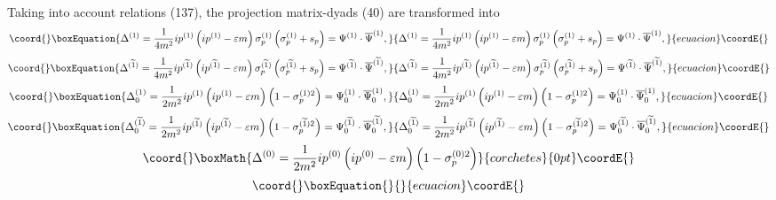 \documentclass[a4paper,12pt]{article}
\begin{document}
Taking into account relations (137), the projection matrix-dyads
(40) are transformed into
\begin{equation}\coord{}\boxEquation{
\Delta ^{(1)}=\frac 1{4m^2}ip^{(1)}\left( ip^{(1)}-\varepsilon
m\right) \sigma _p^{(1)}\left( \sigma _p^{(1)}+s_p\right) =\Psi
^{(1)}\cdot \overline{ \Psi }^{(1)}  ,\label{139}
}{
\Delta ^{(1)}=\frac 1{4m^2}ip^{(1)}\left( ip^{(1)}-\varepsilon
m\right) \sigma _p^{(1)}\left( \sigma _p^{(1)}+s_p\right) =\Psi
^{(1)}\cdot \overline{ \Psi }^{(1)}  ,}{ecuacion}\coordE{}\end{equation}
\begin{equation}\coord{}\boxEquation{
\Delta ^{(\widetilde{1})}=\frac 1{4m^2}ip^{(\widetilde{1})}\left(
ip^{( \widetilde{1})}-\varepsilon m\right) \sigma
_p^{(\widetilde{1})}\left( \sigma _p^{(\widetilde{1})}+s_p\right)
=\Psi ^{(\widetilde{1})}\cdot \overline{\Psi }^{(\widetilde{1})} ,
\label{140}
}{
\Delta ^{(\widetilde{1})}=\frac 1{4m^2}ip^{(\widetilde{1})}\left(
ip^{( \widetilde{1})}-\varepsilon m\right) \sigma
_p^{(\widetilde{1})}\left( \sigma _p^{(\widetilde{1})}+s_p\right)
=\Psi ^{(\widetilde{1})}\cdot \overline{\Psi }^{(\widetilde{1})} ,
}{ecuacion}\coordE{}\end{equation}
\begin{equation}\coord{}\boxEquation{
\Delta _0^{(1)}=\frac 1{2m^2}ip^{(1)}\left( ip^{(1)}-\varepsilon
m\right) \left( 1-\sigma _p^{(1)2}\right) =\Psi _0^{(1)}\cdot
\overline{\Psi }_0^{(1)} ,\label{141}
}{
\Delta _0^{(1)}=\frac 1{2m^2}ip^{(1)}\left( ip^{(1)}-\varepsilon
m\right) \left( 1-\sigma _p^{(1)2}\right) =\Psi _0^{(1)}\cdot
\overline{\Psi }_0^{(1)} ,}{ecuacion}\coordE{}\end{equation}
\begin{equation}\coord{}\boxEquation{
\Delta _0^{(\widetilde{1})}=\frac
1{2m^2}ip^{(\widetilde{1})}\left( ip^{(
\widetilde{1})}-\varepsilon m\right) \left( 1-\sigma
_p^{(\widetilde{1} )2}\right) =\Psi _0^{(\widetilde{1})}\cdot
\overline{\Psi }_0^{(\widetilde{1} )} , \label{142}
}{
\Delta _0^{(\widetilde{1})}=\frac
1{2m^2}ip^{(\widetilde{1})}\left( ip^{(
\widetilde{1})}-\varepsilon m\right) \left( 1-\sigma
_p^{(\widetilde{1} )2}\right) =\Psi _0^{(\widetilde{1})}\cdot
\overline{\Psi }_0^{(\widetilde{1} )} , }{ecuacion}\coordE{}\end{equation}
\[\coord{}\boxMath{
\Delta ^{(0)}=\frac 1{2m^2}ip^{(0)}\left( ip^{(0)}-\varepsilon m\right)
\left( 1-\sigma _p^{(0)2}\right)
}{corchetes}{0pt}\coordE{}\]
\vspace{-8mm}
\begin{equation}\coord{}\boxEquation{  \label{143}
}{  }{ecuacion}\coordE{}\end{equation}
\end{document}
